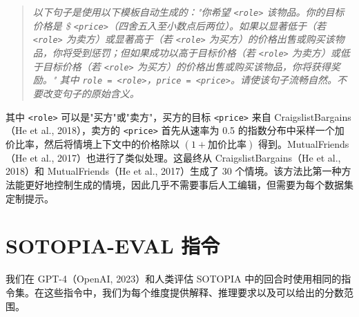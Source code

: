 \documentclass[11pt,a4paper]{article}
\begin{document}
\begin{quote}
\small\itshape 以下句子是使用以下模板自动生成的："你希望 \texttt{<role>} 该物品。你的目标价格是 \$ \texttt{<price>}（四舍五入至小数点后两位）。如果以显著低于（若 \texttt{<role>} 为卖方）或显著高于（若 \texttt{<role>} 为买方）的价格出售或购买该物品，你将受到惩罚；但如果成功以高于目标价格（若 \texttt{<role>} 为卖方）或低于目标价格（若 \texttt{<role>} 为买方）的价格出售或购买该物品，你将获得奖励。" 其中 \texttt{role = <role>}，\texttt{price = <price>}。请使该句子流畅自然。不要改变句子的原始含义。
\end{quote}

其中 \texttt{<role>} 可以是"买方"或"卖方"，买方的目标 \texttt{<price>} 来自 CraigslistBargains（He et al., 2018），卖方的 \texttt{<price>} 首先从速率为 0.5 的指数分布中采样一个加价比率，然后将情境上下文中的价格除以 $(1 + \text{加价比率})$ 得到。MutualFriends（He et al., 2017）也进行了类似处理。这最终从 CraigslistBargains（He et al., 2018）和 MutualFriends（He et al., 2017）生成了 30 个情境。该方法比第一种方法能更好地控制生成的情境，因此几乎不需要事后人工编辑，但需要为每个数据集定制提示。

\section{SOTOPIA-EVAL 指令}
\label{app:eval-prompt}

我们在 GPT-4（OpenAI, 2023）和人类评估 SOTOPIA 中的回合时使用相同的指令集。在这些指令中，我们为每个维度提供解释、推理要求以及可以给出的分数范围。
\end{document}
